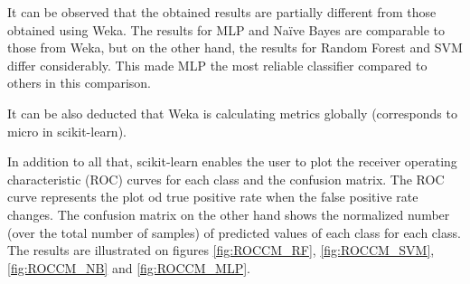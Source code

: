 It can be observed that the obtained results are partially different from those obtained using Weka. The results for MLP and Naïve Bayes are comparable to those from Weka, but on the other hand, the results for Random Forest and SVM differ considerably. This made MLP the most reliable classifier compared to others in this comparison.

It can be also deducted that Weka is calculating metrics globally (corresponds to micro in scikit-learn).

In addition to all that, scikit-learn enables the user to plot the receiver operating characteristic (ROC) curves for each class and the confusion matrix. The ROC curve represents the plot od true positive rate when the false positive rate changes. The confusion matrix on the other hand shows the normalized number (over the total number of samples) of predicted values of each class for each class. The results are illustrated on figures \ref{fig:ROCCM_RF}, \ref{fig:ROCCM_SVM}, \ref{fig:ROCCM_NB} and \ref{fig:ROCCM_MLP}.

